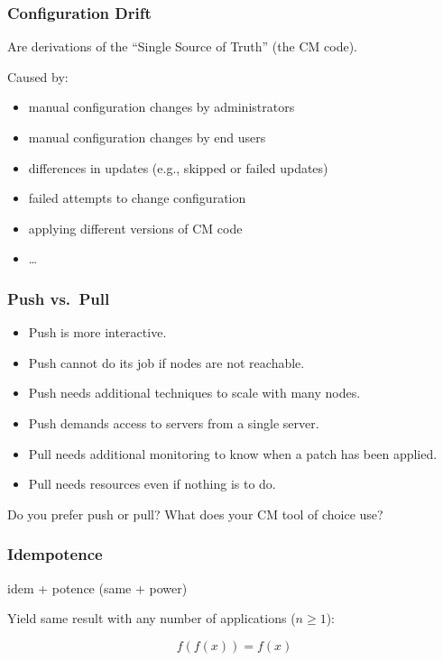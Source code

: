\begin{frame}
	\frametitle{Configuration Drift}

	Are derivations of the ``Single Source of Truth'' (the CM code).

	Caused by:

	\pause

	\begin{itemize}[<+-| alert@+>]
	\item manual configuration changes by administrators
	\item manual configuration changes by end users
	\item differences in updates (e.g., skipped or failed updates)
	\item failed attempts to change configuration
	\item applying different versions of CM code
	\item \dots
	\end{itemize}


\end{frame}

\begin{frame}
	\frametitle{Push vs.\ Pull}

	\begin{itemize}[<+-| alert@+>]
	\item Push is more interactive.
	\item Push cannot do its job if nodes are not reachable.
	\item Push needs additional techniques to scale with many nodes.
	\item Push demands access to servers from a single server.
	\item Pull needs additional monitoring to know when a patch has been applied.
	\item Pull needs resources even if nothing is to do.
	\end{itemize}

	\begin{task}
	Do you prefer push or pull?
	What does your CM tool of choice use?
	\end{task}
\end{frame}


\begin{frame}
	\frametitle{Idempotence}

	idem + potence (same + power)
	\vspace{2em}

	Yield same result with any number of applications ($n\ge1$):
		
	\[
		f(f(x))=f(x)
	\]
\end{frame}



